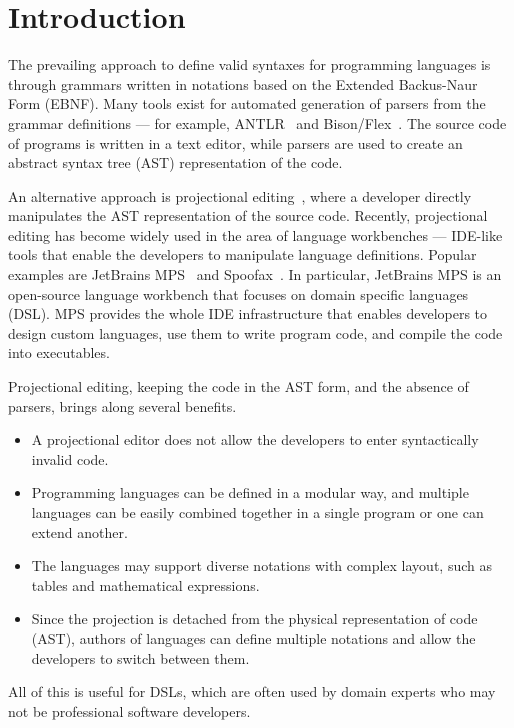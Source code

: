 \section{Introduction}

The prevailing approach to define valid syntaxes for programming languages is through grammars written in notations based on the Extended Backus-Naur Form (EBNF).
Many tools exist for automated generation of parsers from the grammar definitions --- for example, ANTLR~\cite{ref:ANTLRBOOK,ref:ANTLR} and Bison/Flex~\cite{ref:BISONFLEX}.
The source code of programs is written in a text editor, while parsers are used to create an abstract syntax tree (AST) representation of the code.

An alternative approach is projectional editing~\cite{ref:VWK15,ref:VSB14,ref:DHL80}, where a developer directly manipulates the AST representation of the source code.
Recently, projectional editing has become widely used in the area of language workbenches --- IDE-like tools that enable the developers to manipulate language definitions.
Popular examples are JetBrains MPS~\cite{ref:MPS,ref:MPSBOOK} and Spoofax~\cite{ref:KV10}.
In particular, JetBrains MPS is an open-source language workbench that focuses on domain specific languages (DSL).
MPS provides the whole IDE infrastructure that enables developers to design custom languages, use them to write program code, and compile the code into executables.

Projectional editing, keeping the code in the AST form, and the absence of parsers, brings along several benefits.
\begin{itemize}
	\item A projectional editor does not allow the developers to enter syntactically invalid code.
	\item Programming languages can be defined in a modular way, and multiple languages can be easily combined together in a single program or one can extend another.
	\item The languages may support diverse notations with complex layout, such as tables and mathematical expressions.
	\item Since the projection is detached from the physical representation of code (AST), authors of languages can define multiple notations and allow the developers to switch between them.
\end{itemize}
All of this is useful for DSLs, which are often used by domain experts who may not be professional software developers.


